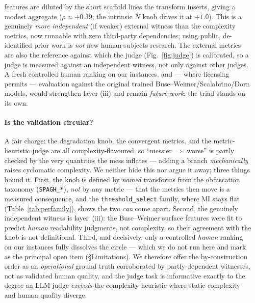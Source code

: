 \documentclass[11pt]{article}
\begin{document}
features are diluted by the short scaffold lines the transform inserts, giving a modest
aggregate ($\rho\approx+0.39$; the intrinsic $N$ knob drives it at $+1.0$). This is a
genuinely \emph{more independent} (if weaker) external witness than the complexity metrics,
now runnable with zero third-party dependencies; using public, de-identified prior work is
\emph{not} new human-subjects research. The external metrics are also the reference against
which the judge (Fig.~\ref{fig:judge}) is calibrated, so a judge is measured against an
independent witness, not only against other judges. A fresh controlled human ranking on our
instances, and --- where licensing permits --- evaluation against the original trained
Buse--Weimer/Scalabrino/Dorn models, would strengthen layer (iii) and remain
\emph{future work}; the triad stands on its own.

\paragraph{Is the validation circular?} A fair charge: the degradation knob, the
convergent metrics, and the metric-heuristic judge are all complexity-flavoured, so
``messier $\Rightarrow$ worse'' is partly checked by the very quantities the mess inflates
--- adding a branch \emph{mechanically} raises cyclomatic complexity. We neither hide this
nor argue it away; three things bound it. First, the knob is defined by \emph{named}
transforms from the obfuscation taxonomy (\texttt{SPAGH\_*}), \emph{not} by any metric ---
that the metrics then move is a measured consequence, and the \texttt{threshold\_select}
family, where MI stays flat (Table~\ref{tab:perfamily}), shows the two \emph{can} come
apart. Second, the genuinely independent witness is layer~(iii): the Buse--Weimer surface
features were fit to predict \emph{human} readability judgments, not complexity, so their
agreement with the knob is not definitional. Third, and decisively, only a controlled
\emph{human} ranking on our instances fully dissolves the circle --- which we do not run
here and mark as the principal open item (\S Limitations). We therefore offer the
by-construction order as an \emph{operational} ground truth corroborated by partly-dependent
witnesses, not as validated human quality, and the judge task is informative exactly to the
degree an LLM judge \emph{exceeds} the complexity heuristic where static complexity and
human quality diverge.
\end{document}
